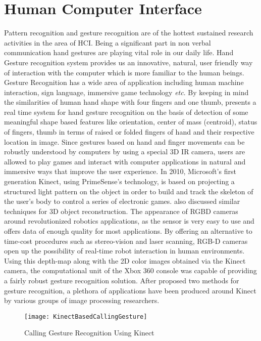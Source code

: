 \section{Human Computer Interface}
\indent
Pattern recognition and gesture recognition are of the hottest sustained research activities in the area of HCI. Being a significant part in non verbal communication hand gestures are playing vital role in our daily life. Hand Gesture recognition system provides us an innovative, natural, user friendly way of interaction with the computer which is more familiar to the human beings. Gesture Recognition has a wide area of application including human machine interaction, sign language, immersive game technology \textit{etc}. By keeping in mind the similarities of human hand shape with four fingers and one thumb, \cite{gestureRecognition12} presents a real time system for hand gesture recognition on the basis of detection of some meaningful shape based features like orientation, center of mass (centroid), status of fingers, thumb in terms of raised or folded fingers of hand and their respective location in image. Since gestures based on hand and finger movements can be robustly understood by computers by using a special 3D IR camera, users are allowed to play games and interact with computer applications in natural and immersive ways that improve the user experience. In 2010, Microsoft's first generation Kinect, using PrimeSense’s technology, is based on projecting a structured light pattern on the object in order to build and track the skeleton of the user’s body to control a series of electronic games. \cite{SL3Dfrom2D96} also discussed similar techniques for 3D object reconstruction. The appearance of RGBD cameras around revolutionized robotics applications, as the sensor is very easy to use and oﬀers data of enough quality for most applications. By offering an alternative to time-cost procedures such as stereo-vision and laser scanning, RGB-D cameras open up the possibility of real-time robot interaction in human environments. Using this depth-map along with the 2D color images obtained via the Kinect camera, the computational unit of the Xbox 360 console was capable of providing a fairly robust gesture recognition solution. After \cite{KinectGesture12} proposed two methods for gesture recognition, a plethora of applications have been produced around Kinect by various groups of image processing researchers.
\\\indent%
\begin{figure}[t]
\centering
\texttt{[image: KinectBasedCallingGesture]}
\caption{Calling Gesture Recognition Using Kinect \cite{gestureKinect14}}
\label{KinectBasedCallingGesture}
\end{figure}%
